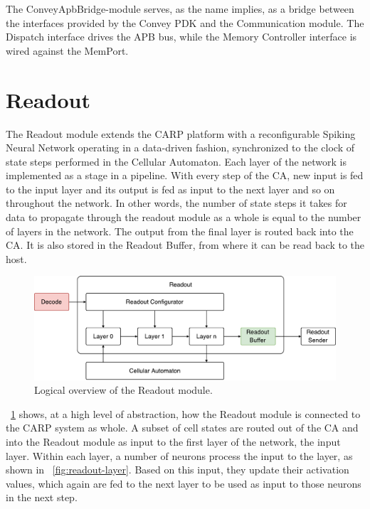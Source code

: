 The ConveyApbBridge-module serves, as the name implies, as a bridge between the
interfaces provided by the Convey PDK and the Communication module. The Dispatch
interface drives the APB bus, while the Memory Controller interface is wired
against the MemPort.


\clearpage


\section{Readout}

The Readout module extends the CARP platform with a reconfigurable Spiking
Neural Network operating in a data-driven fashion, synchronized to the clock of
state steps performed in the Cellular Automaton. Each layer of the network is
implemented as a stage in a pipeline. With every step of the CA, new input is
fed to the input layer and its output is fed as input to the next layer and so
on throughout the network. In other words, the number of state steps it takes
for data to propagate through the readout module as a whole is equal to the
number of layers in the network. The output from the final layer is routed back
into the CA. It is also stored in the Readout Buffer, from where it can be read
back to the host.

\begin{figure}[ht]
  \centering
  \includegraphics[width=\linewidth]{fig/readout-io}
  \caption{Logical overview of the Readout module.}
  \label{fig:readout-io}
\end{figure}

\figurename~\ref{fig:readout-io} shows, at a high level of abstraction, how the
Readout module is connected to the CARP system as whole. A subset of cell states
are routed out of the CA and into the Readout module as input to the first layer
of the network, the input layer. Within each layer, a number of neurons process
the input to the layer, as shown in \figurename~\ref{fig:readout-layer}. Based
on this input, they update their activation values, which again are fed to the
next layer to be used as input to those neurons in the next step.

